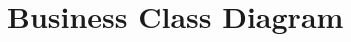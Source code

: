 \begin{comment}
\begin{center}
\begin{tikzpicture}
\begin{umlsystem}[fill=red!10]{The system}

\umlusecase[x=7, width=5cm]{1.Limit upload/download speed}
\umlusecase[x= 1.5, width =1.5cm]{2.Search File}
\umlusecase[x=-1, y=-2, width =1.5cm]{3.Download File}
\umlusecase[x=3, y=-2, width =1.5cm]{4.Stream File}
\umlusecase[x=8, y=-4, width=3cm]{5.Play Media File}
\umlusecase[x=2, y=-6, width=3cm]{6.Browse File System}
\umlusecase[x=0.5, y=-12, width=1.5cm]{7.Search Files}
\umlusecase[x=-1, y=-9, width=1.5cm]{8.Update Files}
\umlusecase[x=3, y=-9, width=1.5cm]{9.Delete Files}
\umlusecase[x=9, y=-8, width=3cm]{10.Change File Visibility}
\umlusecase[x=8, y=-10, width=1.5cm]{11.Sort Files}
\umlusecase[x=-1, y=-15, width=1.5cm]{12.Search locally}
\umlusecase[x=2, y=-15, width=1.5cm]{13.Search on the net}
\umlusecase[x=4, y=-12, width=1.5cm]{14.Sort on date}
\umlusecase[x=6, y=-12, width=1.5cm]{15.Sort on type}
\umlusecase[x=8, y=-12, width=1.5cm]{16.Sort on name}
\umlusecase[x=10, y=-12, width=1.5cm]{17.Sort on size}

\end{umlsystem}

\umlactor[x=12.5, y=-5]{User}

\umlinclude[name=incl]{usecase-3}{usecase-2}
\umlinclude[name=incl]{usecase-4}{usecase-2}
\umlinclude[name=incl]{usecase-4}{usecase-5}

\umlinclude[name=incl]{usecase-5}{usecase-6}
\umlinclude[name=incl]{usecase-8}{usecase-6}
\umlinclude[name=incl]{usecase-9}{usecase-6}
\umlinclude[name=incl]{usecase-10}{usecase-6}
\umlinclude[name=incl]{usecase-11}{usecase-6}

\umlinclude[name=incl]{usecase-8}{usecase-7}
\umlinclude[name=incl]{usecase-9}{usecase-7}

\umlVHextend{usecase-14}{usecase-11}
\umlVHextend{usecase-15}{usecase-11}
\umlVHextend{usecase-16}{usecase-11}
\umlVHextend{usecase-17}{usecase-11}

\umlVHextend{usecase-12}{usecase-7}
\umlVHextend{usecase-13}{usecase-7}

\end{tikzpicture}
\end{center}
\end{comment}

\section{Business Class Diagram}


